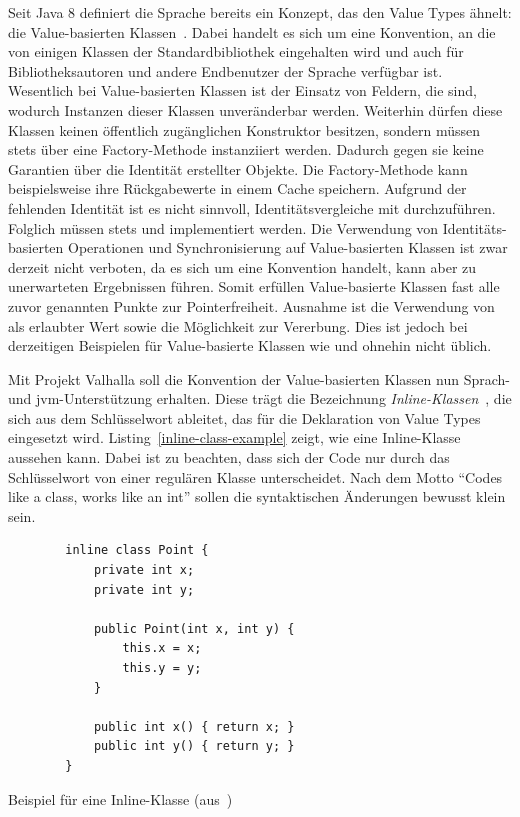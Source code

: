 Seit Java 8 definiert die Sprache bereits ein Konzept, das den Value Types ähnelt: die Value-basierten Klassen~\cite{value-based-classes}.
Dabei handelt es sich um eine Konvention, an die von einigen Klassen der Standardbibliothek eingehalten wird und auch für Bibliotheksautoren und andere Endbenutzer der Sprache verfügbar ist.
Wesentlich bei Value-basierten Klassen ist der Einsatz von Feldern, die  sind, wodurch Instanzen dieser Klassen unveränderbar werden.
Weiterhin dürfen diese Klassen keinen öffentlich zugänglichen Konstruktor besitzen, sondern müssen stets über eine Factory-Methode instanziiert werden.
Dadurch gegen sie keine Garantien über die Identität erstellter Objekte.
Die Factory-Methode kann beispielsweise ihre Rückgabewerte in einem Cache speichern.
Aufgrund der fehlenden Identität ist es nicht sinnvoll, Identitätsvergleiche mit \code{==} durchzuführen.
Folglich müssen stets  und  implementiert werden.
Die Verwendung von Identitäts-basierten Operationen und Synchronisierung auf Value-basierten Klassen ist zwar derzeit nicht verboten, da es sich um eine Konvention handelt, kann aber zu unerwarteten Ergebnissen führen.
Somit erfüllen Value-basierte Klassen fast alle zuvor genannten Punkte zur Pointerfreiheit.
Ausnahme ist die Verwendung von  als erlaubter Wert sowie die Möglichkeit zur Vererbung.
Dies ist jedoch bei derzeitigen Beispielen für Value-basierte Klassen wie  und  ohnehin nicht üblich.

Mit Projekt Valhalla soll die Konvention der Value-basierten Klassen nun Sprach- und \ac{jvm}-Unterstützung erhalten.
Diese trägt die Bezeichnung \emph{Inline-Klassen}~\cite{object-model}, die sich aus dem Schlüsselwort  ableitet, das für die Deklaration von Value Types eingesetzt wird.
Listing~\ref{inline-class-example} zeigt, wie eine Inline-Klasse aussehen kann.
Dabei ist zu beachten, dass sich der Code nur durch das Schlüsselwort  von einer regulären Klasse unterscheidet.
Nach dem Motto ``Codes like a class, works like an int'' sollen die syntaktischen Änderungen bewusst klein sein.

\begin{listing}
    \begin{verbatim}
        inline class Point {
            private int x;
            private int y;

            public Point(int x, int y) {
                this.x = x;
                this.y = y;
            }

            public int x() { return x; }
            public int y() { return y; }
        }
    \end{verbatim}
    \caption{Beispiel für eine Inline-Klasse (aus~\cite{object-model})}
    \label{inline-class-example}
\end{listing}

